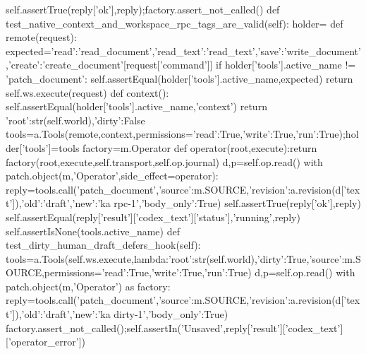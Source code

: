     self.assertTrue(reply['ok'],reply);factory.assert_not_called()
 def test_native_context_and_workspace_rpc_tags_are_valid(self):
  holder={}
  def remote(request):
   expected={'read':'read_document','read_text':'read_text','save':'write_document','create':'create_document'}[request['command']]
   if holder['tools'].active_name != 'patch_document':
    self.assertEqual(holder['tools'].active_name,expected)
   return self.ws.execute(request)
  def context():
   self.assertEqual(holder['tools'].active_name,'context')
   return {'root':str(self.world),'dirty':False}
  tools=a.Tools(remote,context,permissions={'read':True,'write':True,'run':True});holder['tools']=tools
  factory=m.Operator
  def operator(root,execute):return factory(root,execute,self.transport,self.op.journal)
  d,p=self.op.read()
  with patch.object(m,'Operator',side_effect=operator):
   reply=tools.call('patch_document',{'source':m.SOURCE,'revision':a.revision(d['text']),'old':'draft','new':'ka rpc-1','body_only':True})
  self.assertTrue(reply['ok'],reply)
  self.assertEqual(reply['result']['codex_text']['status'],'running',reply)
  self.assertIsNone(tools.active_name)
 def test_dirty_human_draft_defers_hook(self):
  tools=a.Tools(self.ws.execute,lambda:{'root':str(self.world),'dirty':True,'source':m.SOURCE},permissions={'read':True,'write':True,'run':True})
  d,p=self.op.read()
  with patch.object(m,'Operator') as factory:
   reply=tools.call('patch_document',{'source':m.SOURCE,'revision':a.revision(d['text']),'old':'draft','new':'ka dirty-1','body_only':True})
  factory.assert_not_called();self.assertIn('Unsaved',reply['result']['codex_text']['operator_error'])


